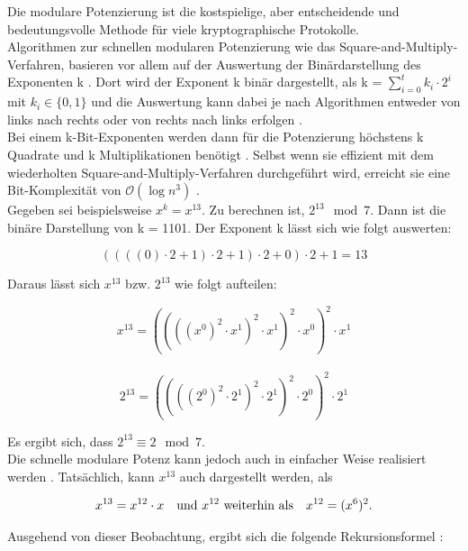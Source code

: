 Die modulare Potenzierung ist die kostspielige, aber
entscheidende und bedeutungsvolle Methode für viele kryptographische Protokolle. \\

Algorithmen zur schnellen modularen Potenzierung wie das Square-and-Multiply-Verfahren, basieren vor
allem auf der Auswertung der Binärdarstellung des Exponenten k \cite{langMEI}. 
Dort wird der Exponent k binär dargestellt, als k = \(\sum_{i=0}^{t} k_i \cdot 2^i\) mit $ k_i \in \{0, 1\}$ und die Auswertung kann dabei je nach Algorithmen entweder von links nach rechts oder von rechts nach links erfolgen \cite{langMEI}. \\

Bei einem k-Bit-Exponenten werden dann für die Potenzierung höchstens k Quadrate und k Multiplikationen benötigt \cite{langMEI}.
Selbst wenn sie effizient mit dem wiederholten Square-and-Multiply-Verfahren durchgeführt wird, erreicht sie eine Bit-Komplexität von $\mathcal{O}(\log{}n^3)$ \cite{menezes:1997}.  \\

Gegeben sei beispielsweise \(x^k = x^{13}\). Zu berechnen ist, \( 2^{13} \mod 7\).
Dann ist die binäre Darstellung von k = 1101. Der Exponent k lässt sich wie folgt auswerten:
\begin{ceqn}
  \[((((0) \cdot 2 + 1) \cdot 2 + 1) \cdot 2 + 0) \cdot 2 + 1   =   13 \]
\end{ceqn}

Daraus lässt sich $ x^{13} $ bzw. $ 2^{13}$ wie folgt aufteilen:\\
\begin{ceqn}
   \[ x^{13} = ((((x^0)^2 \cdot x^1)^2 \cdot x^1)^2 \cdot x^0)^2 \cdot x^1 \] \\
   \[ 2^{13} = ((((2^0)^2 \cdot 2^1)^2 \cdot 2^1)^2 \cdot 2^0)^2 \cdot 2^1 \] 
\end{ceqn}

Es ergibt sich, dass \( 2^{13} \equiv 2 \mod 7\).\\

Die schnelle modulare Potenz kann jedoch auch in einfacher Weise realisiert werden \cite{langME}. Tatsächlich, kann \( x^{13}\) auch dargestellt werden, als 

\begin{align*}
    x^{13} = x^{12} \cdot x \quad \text{und \( x^{12}\) weiterhin als} \quad x^{12} = (x^{6})^2.
\end{align*}

Ausgehend von dieser Beobachtung, ergibt sich die folgende Rekursionsformel \cite{langME}:

